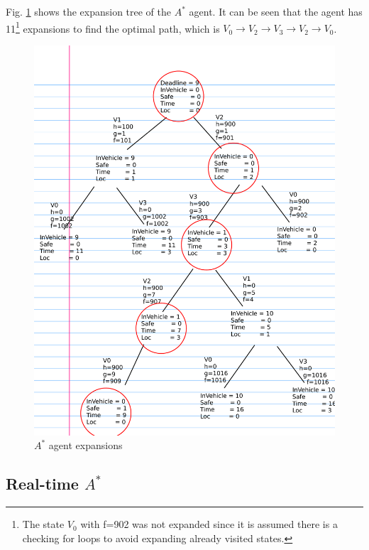 \documentclass{article}                     %
\begin{document}
	Fig. \ref{fig:q2b} shows the expansion tree of the $ A^* $ agent. It can be seen that the agent has 11\footnote{The state $ V_0 $ with f=902 was not expanded since it is assumed there is a checking for loops to avoid expanding already visited states.} expansions to find the optimal path, which is $ V_0\rightarrow V_2\rightarrow V_3\rightarrow V_2\rightarrow V_0$. 

	
	\begin{figure}
		\centering
		\includegraphics[width=0.5\linewidth]{q2_b}
		\caption{$ A^* $ agent expansions}
		\label{fig:q2b}
	\end{figure}

	\subsection{Real-time $ A^* $}
	
\end{document}
